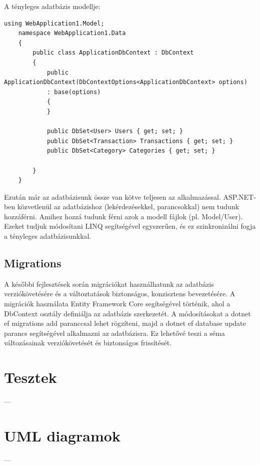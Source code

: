 A tényleges adatbázis modellje:

\begin{lstlisting}[language={[Sharp]C}]
	using WebApplication1.Model;
	namespace WebApplication1.Data
	{
		public class ApplicationDbContext : DbContext
		{
			public ApplicationDbContext(DbContextOptions<ApplicationDbContext> options)
			: base(options)
			{
			}
			
			public DbSet<User> Users { get; set; }
			public DbSet<Transaction> Transactions { get; set; }
			public DbSet<Category> Categories { get; set; }
			
		}
	}
\end{lstlisting}

Ezután már az adatbázisunk össze van kötve teljesen az alkalmazással. ASP.NET-ben közvetlenül az adatbázishoz (lekérdezésekkel, parancsokkal) nem tudunk hozzáférni. Amihez hozzá tudunk férni azok a modell fájlok (pl. Model/User). Ezeket tudjuk módosítani LINQ segítségével egyszerűen, és ez szinkronizálni fogja
a tényleges adatbázisunkkal.

\subsection{Migrations}
A későbbi fejlesztések során migrációkat használhatunk az adatbázis verziókövetésére és a változtatások biztonságos, konzisztens bevezetésére. A migrációk használata Entity Framework Core segítségével történik, ahol a DbContext osztály definiálja az adatbázis szerkezetét. A módosításokat a dotnet ef migrations add paranccsal lehet rögzíteni, majd a dotnet ef database update parancs segítségével alkalmazni az adatbázisra. Ez lehetővé teszi a séma változásainak verziókövetését és biztonságos frissítését.



\section{Tesztek}
---

\section{UML diagramok}
---

